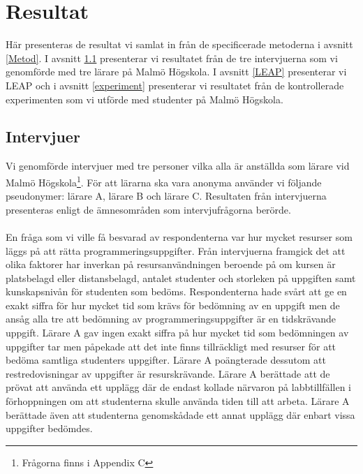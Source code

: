 \documentclass[a4paper,11pt]{article}
\begin{document}
{\section{Resultat}
Här presenteras de resultat vi samlat in från de specificerade metoderna i avsnitt \ref{Metod}. I avsnitt \ref{result:Intervjuer} presenterar vi resultatet från de tre intervjuerna som vi genomförde med tre lärare på Malmö Högskola. I avsnitt \ref{LEAP} presenterar vi LEAP och i avsnitt \ref{experiment} presenterar vi resultatet från de kontrollerade experimenten som vi utförde med studenter på Malmö Högskola.

\subsection{Intervjuer}\label{result:Intervjuer}
Vi genomförde intervjuer med tre personer vilka alla är anställda som lärare vid Malmö Högskola\footnote{Frågorna finns i Appendix C}. För att lärarna ska vara anonyma använder vi följande pseudonymer: lärare A, lärare B och lärare C. Resultaten från intervjuerna presenteras enligt de ämnesområden som intervjufrågorna berörde.
\\
\\
En fråga som vi ville få besvarad av respondenterna var hur mycket resurser som läggs på att rätta programmeringsuppgifter. Från intervjuerna framgick det att olika faktorer har inverkan på resursanvändningen beroende på om kursen är platsbelagd eller distansbelagd, antalet studenter och storleken på uppgiften samt kunskapsnivån för studenten som bedöms. Respondenterna hade svårt att ge en exakt siffra för hur mycket tid som krävs för bedömning av en uppgift men de ansåg alla tre att bedömning av programmeringsuppgifter är en tidskrävande uppgift. Lärare A gav ingen exakt siffra på hur mycket tid som bedömningen av uppgifter tar men påpekade att det inte finns tillräckligt med resurser för att bedöma samtliga studenters uppgifter. Lärare A poängterade dessutom att restredovisningar av uppgifter är resurskrävande. Lärare A berättade att de prövat att använda ett upplägg där de endast kollade närvaron på labbtillfällen i förhoppningen om att studenterna skulle använda tiden till att arbeta. Lärare A berättade även att studenterna genomskådade ett annat upplägg där enbart vissa uppgifter bedömdes.

}
\end{document}
